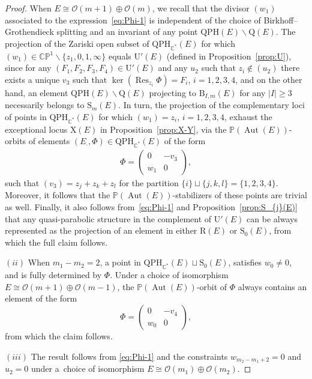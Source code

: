 \documentclass[10pt,a4paper]{amsart}
\newcommand{\field}[1]{\ensuremath{\mathbb{#1}}}
\newcommand{\CC}{\field{C}}
\newcommand{\PP}{\field{P}}
\newcommand{\calO}{\mathcal{O}}
\newcommand{\qp}{\boldsymbol{\cdot}}
\DeclareMathOperator{\Aut}{Aut}
\DeclareMathOperator{\Res}{Res}
\numberwithin{equation}{section}
\begin{document}
\begin{proof}
When $E\cong \calO(m+1)\oplus\calO(m)$, we recall that the divisor $(w_{1})$ associated to the expression~\eqref{eq:Phi-1} is independent of the choice of Birkhoff--Grothendieck splitting and an invariant of any point $\mathrm{QPH}(E)\backslash\mathrm{Q}(E)$. The projection of the Zariski open subset of $\mathrm{QPH}_{\CC^{*}}(E)$ for which $(w_{1})\in\CC\PP^{1}\backslash\{z_{1},0,1,\infty\}$ equals $\mathrm{U}'(E)$ (defined in Proposition~\ref{prop:U}), since for any $(F_{1},F_{2},F_{3},F_{4})\in\mathrm{U}'(E)$ and any $u_{2}$ such that $z_{i}\not\in(u_{2})$ there exists a unique $v_{3}$ such that $\ker(\Res_{z_{i}}\Phi) = F_{i}$, $i=1,2,3,4$, and on the other hand, an element $\mathrm{QPH}(E)\backslash\mathrm{Q}(E)$ projecting to $\mathrm{B}_{I,m}(E)$ for any $\vert I\vert \geq 3$ necessa\-rily belongs to $\mathrm{S}_{m}(E)$. In turn, the projection of the complementary loci of points in $\mathrm{QPH}_{\CC^{*}}(E)$ for which $(w_{1})=z_{i}$, $i=1,2,3,4$,
exhaust the exceptional locus $\mathrm{X}(E)$ in Proposition~\ref{prop:X-Y}, via the $\PP(\Aut(E))$-orbits of elements $(E_{\qp},\Phi)\in\mathrm{QPH}_{\CC^{*}}(E)$ of the form
\begin{gather}\label{eq:HX-1}
\Phi = \begin{pmatrix}
0 & -v_{3}\\
w_{1} & 0
\end{pmatrix}\!,
\end{gather}
such that $(v_{3}) = z_{j} + z_{k} + z_{l}$ for the partition $\{i\}\sqcup\{j,k,l\}=\{1,2,3,4\}$. Moreover, it follows that the $\PP(\Aut(E))$-stabilizers of these points are trivial as well. Finally, it also follows from~\eqref{eq:Phi-1} and Proposition~\ref{prop:S_{j}(E)} that any quasi-parabolic structure in the complement of $\mathrm{U}'(E)$ can be always represented as the projection of an element in either $\mathrm{R}(E)$ or $\mathrm{S}_{0}(E)$, from which the full claim follows.

$(ii)$ When $m_{1}-m_{2}=2$, a point in $\mathrm{QPH}_{\CC^{*}}(E)\sqcup \mathrm{S}_{0}(E)$, satisfies $w_{0}\neq 0$, and is fully determined by $\Phi$. Under a choice of isomorphism $E\cong\calO(m+1)\oplus\calO(m-1)$, the $\PP(\Aut(E))$-orbit of $\Phi$ always contains an element of the form
\[
\Phi = \begin{pmatrix}
0 & -v_{4}\\
w_{0} & 0
\end{pmatrix}\!,
\]
from which the claim follows.

$(iii)$ The result follows from \eqref{eq:Phi-1} and the constraints $w_{m_{2}-m_{1}+2}=0$ and $u_{2}=0$ under a~choice of isomorphism $E\cong \calO(m_{1})\oplus\calO(m_{2})$.
\end{proof}
\end{document}
